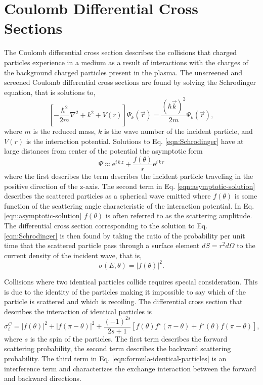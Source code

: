\section{Coulomb Differential Cross Sections}
The Coulomb differential cross section describes the collisions that charged particles experience in a medium as a result of interactions with the charges of the background charged particles present in the plasma. The unscreened and screened Coulomb differential cross sections are found by solving the Schrodinger equation, that is solutions to,
\begin{equation} \label{eqn:Schrodinger}
    \left[-\dfrac{\hbar^2}{2 m}\nabla^2 + k^2 + V(r)\right] \Psi_k(\vec{r}) = \dfrac{(\hbar \vec{k})^2}{2m} \Psi_k(\vec{r}),
\end{equation}
where $m$ is the reduced mass, $k$ is the wave number of the incident particle, and $V(r)$ is the interaction potential. Solutions to Eq. \eqref{eqn:Schrodinger} have at large distances from center of the potential the asymptotic form 
\begin{equation}  \label{eqn:asymptotic-solution}
    \Psi \approx \text{e}^{i\,k\,z} + \dfrac{f(\theta)}{r}\text{e}^{i\,k\,r}
\end{equation}
where the first describes the term describes the incident particle traveling in the positive direction of the z-axis. The second term in Eq. \eqref{eqn:asymptotic-solution} describes the scattered particles as a spherical wave emitted where $f(\theta)$ is some function of the scattering angle characteristic of the interaction potential. In Eq. \eqref{eqn:asymptotic-solution} $f(\theta)$ is often referred to as the scattering amplitude. The differential cross section corresponding to the solution to Eq. \eqref{eqn:Schrodinger} is then found by taking the ratio of the probability per unit time that the scattered particle pass through a surface element $dS = r^2 d\Omega$ to the current density of the incident wave, that is,
\begin{equation} \label{eqn:formula-distinguishable-particles}
    \sigma(E,\theta) = |f(\theta)|^2.
\end{equation}

Collisions where two identical particles collide requires special consideration. This is due to the identity of the particles making it impossible to say which of the particle is scattered and which is recoiling. The differential cross section that describes the interaction of identical particles is
\begin{equation} \label{eqn:formula-identical-particles}
    \sigma_{i}^{C} = | f(\theta) |^2 + | f(\pi - \theta) |^2 + \dfrac{(-1)^{2s}}{2s+1} \left[ f(\theta) f^{\star}(\pi-\theta) + f^{\star}(\theta) f(\pi-\theta) \right],
\end{equation}
where $s$ is the spin of the particles. The first term describes the forward scattering probability, the second term describes the backward scattering probability. The third term in Eq. \eqref{eqn:formula-identical-particles} is an interference term and characterizes the exchange interaction between the forward and backward directions.

